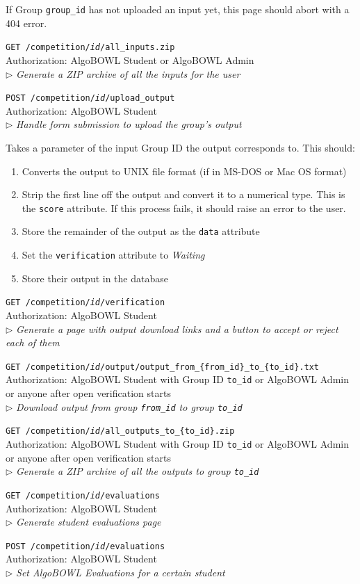 \documentclass[12pt]{article}
\newcommand\ctrltitle[1]{\par\medskip\texttt{\large #1}\\}
\newcommand\ctrlauth[1]{Authorization: #1\\}
\newcommand\ctrldesc[1]{$\rhd$ \textsl{#1}\par\medskip}
\begin{document}
If Group \texttt{group\_id} has not uploaded an input yet, this page should
abort with a 404 error.

\ctrltitle{GET /competition/\emph{id}/all\_inputs.zip}
\ctrlauth{AlgoBOWL Student or AlgoBOWL Admin}
\ctrldesc{Generate a ZIP archive of all the inputs for the user}

\ctrltitle{POST /competition/\emph{id}/upload\_output}
\ctrlauth{AlgoBOWL Student}
\ctrldesc{Handle form submission to upload the group's output}

Takes a parameter of the input Group ID the output corresponds to. This should:

\begin{enumerate}
    \item Converts the output to UNIX file format (if in MS-DOS or Mac OS format)
    \item Strip the first line off the output and convert it to a numerical
        type. This is the \texttt{score} attribute. If this process fails, it
        should raise an error to the user.
    \item Store the remainder of the output as the \texttt{data} attribute
    \item Set the \texttt{verification} attribute to \emph{Waiting}
    \item Store their output in the database
\end{enumerate}

\ctrltitle{GET /competition/\emph{id}/verification}
\ctrlauth{AlgoBOWL Student}
\ctrldesc{Generate a page with output download links and a button to accept or
reject each of them}

\ctrltitle{GET /competition/\emph{id}/output/output\_from\_\{from\_id\}\_to\_\{to\_id\}.txt}
\ctrlauth{AlgoBOWL Student with Group ID \texttt{to\_id} or AlgoBOWL Admin or
anyone after open verification starts}
\ctrldesc{Download output from group \texttt{from\_id} to group
\texttt{to\_id}}

\ctrltitle{GET /competition/\emph{id}/all\_outputs\_to\_\{to\_id\}.zip}
\ctrlauth{AlgoBOWL Student with Group ID \texttt{to\_id} or AlgoBOWL Admin or
anyone after open verification starts}
\ctrldesc{Generate a ZIP archive of all the outputs to group \texttt{to\_id}}

\ctrltitle{GET /competition/\emph{id}/evaluations}
\ctrlauth{AlgoBOWL Student}
\ctrldesc{Generate student evaluations page}

\ctrltitle{POST /competition/\emph{id}/evaluations}
\ctrlauth{AlgoBOWL Student}
\ctrldesc{Set AlgoBOWL Evaluations for a certain student}
\end{document}

